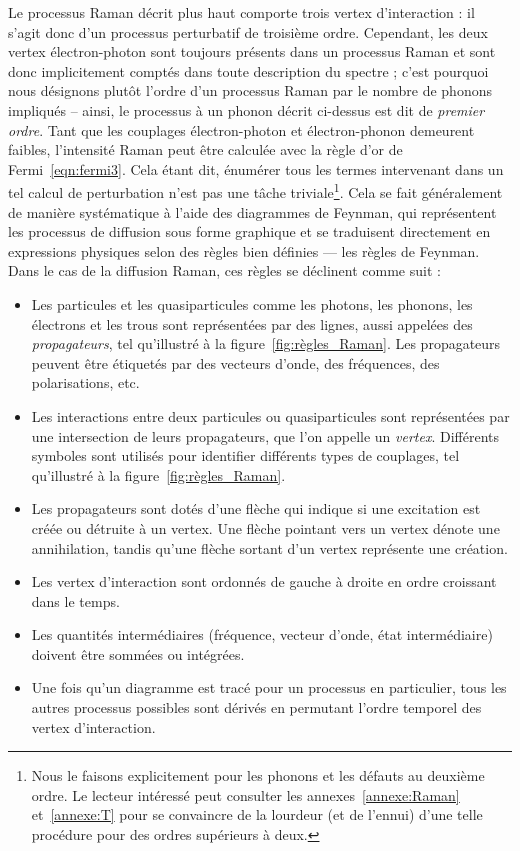Le processus Raman décrit plus haut comporte trois vertex d'interaction : il s'agit donc d'un processus perturbatif de troisième ordre. Cependant, les deux vertex électron-photon sont toujours présents dans un processus Raman et sont donc implicitement comptés dans toute description du spectre ; c'est pourquoi nous désignons plutôt l'ordre d'un processus Raman par le nombre de phonons impliqués -- ainsi, le processus à un phonon décrit ci-dessus est dit de \textit{premier ordre}. Tant que les couplages électron-photon et électron-phonon demeurent faibles, l'intensité Raman peut être calculée avec la règle d'or de Fermi~\eqref{eqn:fermi3}. Cela étant dit, énumérer tous les termes intervenant dans un tel calcul de perturbation n'est pas une tâche triviale\footnote{Nous le faisons explicitement pour les phonons et les défauts au deuxième ordre. Le lecteur intéressé peut consulter les annexes~\ref{annexe:Raman} et~\ref{annexe:T} pour se convaincre de la lourdeur (et de l'ennui) d'une telle procédure pour des ordres supérieurs à deux.}. Cela se fait généralement de manière systématique à l'aide des diagrammes de Feynman, qui représentent les processus de diffusion sous forme graphique et se traduisent directement en expressions physiques selon des règles bien définies --- les règles de Feynman. Dans le cas de la diffusion Raman, ces règles se déclinent comme suit :
\begin{itemize}
    \item Les particules et les quasiparticules comme les photons, les phonons, les électrons et les trous sont représentées par des lignes, aussi appelées des \textit{propagateurs}, tel qu'illustré à la figure~\ref{fig:règles_Raman}. Les propagateurs peuvent être étiquetés par des vecteurs d'onde, des fréquences, des polarisations, etc.
    \item Les interactions entre deux particules ou quasiparticules sont représentées par une intersection de leurs propagateurs, que l'on appelle un \textit{vertex}. Différents symboles sont utilisés pour identifier différents types de couplages, tel qu'illustré à la figure~\ref{fig:règles_Raman}.
    \item Les propagateurs sont dotés d'une flèche qui indique si une excitation est créée ou détruite à un vertex. Une flèche pointant vers un vertex dénote une annihilation, tandis qu'une flèche sortant d'un vertex représente une création.
    \item Les vertex d'interaction sont ordonnés de gauche à droite en ordre croissant dans le temps.
    \item Les quantités intermédiaires (fréquence, vecteur d'onde, état intermédiaire) doivent être sommées ou intégrées.
    \item Une fois qu'un diagramme est tracé pour un processus en particulier, tous les autres processus possibles sont dérivés en permutant l'ordre temporel des vertex d'interaction.
\end{itemize}
